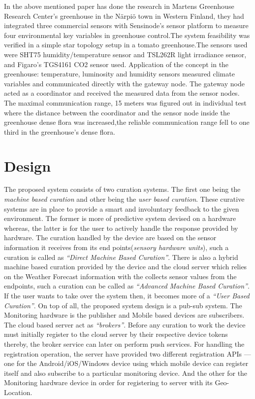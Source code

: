 \documentclass[10pt]{article}
\begin{document}
In the above mentioned paper has done the research in Martens Greenhouse Research Center’s greenhouse in the Närpiö town in Western Finland, they had integrated three commercial sensors with Sensinode’s sensor platform to measure four environmental key variables in greenhouse control.The system feasibility was verified in a simple star topology setup in a tomato greenhouse.The sensors used were SHT75 humidity/temperature sensor and TSL262R light irradiance sensor, and Figaro’s TGS4161 CO2 sensor used. Application of the concept in the greenhouse: temperature, luminosity and humidity sensors measured climate variables and communicated directly with the gateway node. The gateway node acted as a coordinator and received the measured data from the sensor nodes. The maximal communication range, 15 meters was figured out in individual test where the distance between the coordinator and the sensor node inside the greenhouse dense flora was increased,the reliable communication range fell to one third in the greenhouse’s dense flora. 

\section*{Design}

The proposed system consists of two curation systems. The first one being the \emph{machine based curation} and other being the \emph{user based curation}. These curative systems are in place to provide a smart and involuntary feedback to the given environment. The former is more of predictive system devised on a hardware whereas, the latter is for the user to actively handle the response provided by hardware. The curation handled by the device are based on the sensor information it receives from its end points(\emph{sensory hardware units}), such a curation is called as \emph{``Direct Machine Based Curation''}. There is also a hybrid machine based curation provided by the device and the cloud server which relies on the Weather Forecast information with the collects sensor values from the endpoints, such a curation can be called as \emph{``Advanced Machine Based Curation''}. If the user wants to take over the system then, it becomes more of a \emph{``User Based Curation''}. On top of all, the proposed system design is a pub-sub system. The Monitoring hardware is the publisher and Mobile based devices are subscribers. The cloud based server act as \emph{``brokers''}. Before any curation to work the device must initially register to the cloud server by their respective device tokens thereby, the broker service can later on perform push services. For handling the registration operation, the server have provided two different registration APIs --- one for the Android/iOS/Windows device using which mobile device can register itself and also subscribe to a particular monitoring device. And the other for the Monitoring hardware device in order for registering to server with its Geo-Location.
\end{document}
